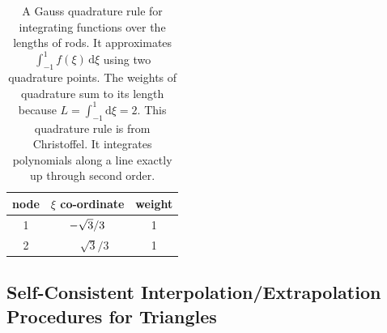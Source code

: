 \begin{table}
    \begin{center}
        \begin{tabular}{|c|cc|}
            \hline
            node & $\xi$ co-ordinate & weight \\ \hline        
            1 & $-\sqrt{3} / 3^{\vphantom{|^|}}$ & 1 \\ 
            2 & $\phantom{-}\sqrt{3} / 3$ & 1 \\ 
            \hline
        \end{tabular}
    \end{center}
    \caption{A Gauss quadrature rule for integrating functions over the lengths of rods.  It approximates $\int_{-1}^1 f(\xi) \, \mathrm{d}\xi$ using two quadrature points.  The weights of quadrature sum to its length because $L = \int_{-1}^1 \mathrm{d} \xi = 2$.  This quadrature rule is from Christoffel.  It integrates polynomials along a line exactly up through second order.}
    \label{tab:2nodeRod}
\end{table}

\subsection{Self-Consistent Interpolation\slash Extrapolation Procedures for Triangles}

